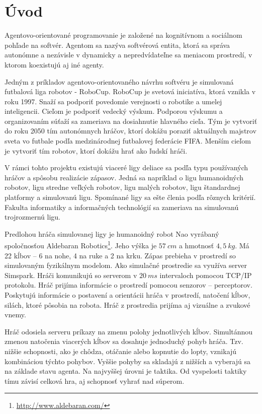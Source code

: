 \section{Úvod}

Agentovo-orientované programovanie \cite{shoham} je založené na kognitívnom a sociálnom pohľade na softvér. Agentom sa nazýva softvérová entita, ktorá sa správa autonómne a nezávisle v dynamicky a nepredvídateľne sa meniacom prostredí, v ktorom koexistujú aj iné agenty.

Jedným z príkladov agentovo-orientovaného návrhu softvéru je simulovaná futbalová liga robotov - RoboCup.
RoboCup \cite{robocup} je svetová iniciatíva, ktorá vznikla v roku 1997. Snaží sa podporiť povedomie verejnosti o robotike a umelej inteligencii. Cieľom je podporiť vedecký výskum. Podporou výskumu a organizovaním súťaží sa zameriava na dosiahnutie hlavného cieľa. Tým je vytvoriť do roku 2050 tím autonómnych hráčov, ktorí dokážu poraziť aktuálnych majstrov sveta vo futbale podľa medzinárodnej futbalovej federácie FIFA. Menším cieľom je vytvoriť tím robotov, ktorí dokážu hrať ako ľudskí hráči. 

V rámci tohto projektu existujú viaceré ligy deliace sa podľa typu používaných hráčov a spôsobu  realizácie  zápasov.  Jedná  sa  napríklad  o ligu  humanoidných  robotov,  ligu  stredne veľkých  robotov,  ligu  malých  robotov,  ligu  štandardnej  platformy  a  simulovanú  ligu. Spomínané  ligy  sa  ešte členia  podľa  rôznych  kritérií. Fakulta informatiky a informačných technológií sa zameriava na simulovanú trojrozmernú ligu. 

Predlohou hráča simulovanej ligy je humanoidný robot Nao vyrábaný spoločnosťou Aldebaran Robotics\footnote{\url{http://www.aldebaran.com/}}. Jeho výška je $57~cm$ a hmotnosť $4,5~kg$. Má 22 kĺbov – 6 na nohe, 4 na ruke a 2 na krku. Zápas prebieha v prostredí so simulovaným fyzikálnym modelom. Ako simulačné prostredie sa využíva server Simspark\cite{simspark}. Hráči komunikujú so serverom v $20~ms$ intervaloch pomocou TCP/IP protokolu. Hráč prijíma informácie o prostredí pomocou senzorov – perceptorov. Poskytujú informácie o postavení a orientácii hráča v prostredí, natočení kĺbov, silách, ktoré pôsobia na robota. Hráč z prostredia prijíma aj vizuálne a zvukové vnemy. 

Hráč  odosiela  serveru  príkazy  na  zmenu polohy  jednotlivých  kĺbov.  Simultánnou  zmenou  natočenia  viacerých  kĺbov  sa  dosahuje jednoduchý pohyb hráča. Tzv. nižšie schopnosti, ako je chôdza, otáčanie alebo kopnutie do lopty, vznikajú kombináciou týchto pohybov. Vyššie pohyby sa skladajú z nižších a vyberajú sa na základe stavu agenta. Na najvyššej úrovni je taktika. Od vyspelosti taktiky tímu závisí celková hra, aj schopnosť vyhrať nad súperom. 

